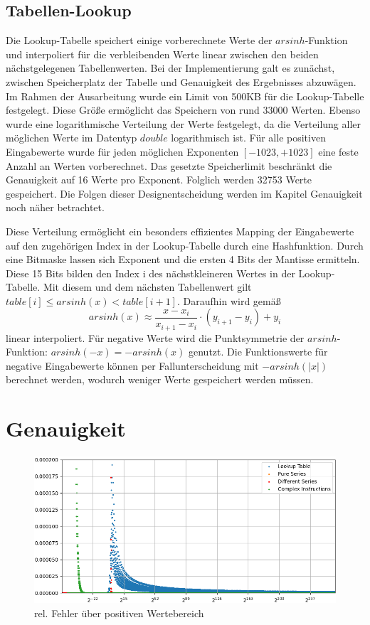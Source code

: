 \documentclass[course=erap] {aspdoc}
\begin{document}
    

    \subsection{Tabellen-Lookup}
    Die Lookup-Tabelle speichert einige vorberechnete Werte der $arsinh$-Funktion und interpoliert für die verbleibenden Werte linear zwischen den beiden nächstgelegenen Tabellenwerten.
    Bei der Implementierung galt es zunächst, zwischen Speicherplatz der Tabelle und Genauigkeit des Ergebnisses abzuwägen.
    Im Rahmen der Ausarbeitung wurde ein Limit von 500KB für die Lookup-Tabelle festgelegt.
    Diese Größe ermöglicht das Speichern von rund 33000 Werten.
    Ebenso wurde eine logarithmische Verteilung der Werte festgelegt, da die Verteilung aller möglichen Werte im Datentyp $double$ logarithmisch ist.
    Für alle positiven Eingabewerte wurde für jeden möglichen Exponenten $[-1023, +1023]$ eine feste Anzahl an Werten vorberechnet.
    Das gesetzte Speicherlimit beschränkt die Genauigkeit auf 16 Werte pro Exponent.
    Folglich werden 32753 Werte gespeichert.
    Die Folgen dieser Designentscheidung werden im Kapitel Genauigkeit noch näher betrachtet.

    Diese Verteilung ermöglicht ein besonders effizientes Mapping der Eingabewerte auf den zugehörigen Index in der Lookup-Tabelle durch eine Hashfunktion.
    Durch eine Bitmaske lassen sich Exponent und die ersten 4 Bits der Mantisse ermitteln.
    Diese 15 Bits bilden den Index i des nächstkleineren Wertes in der Lookup-Tabelle.
    Mit diesem und dem nächsten Tabellenwert gilt $table[i] \leq arsinh(x) < table[i+1]$.
    Daraufhin wird gemäß
    \[
        arsinh(x) \approx \frac{x-x_i}{x_{i+1} - x_i}\cdot (y_{i+1}-y_i) + y_i
    \]
    linear interpoliert.
    Für negative Werte wird die Punktsymmetrie der $arsinh$-Funktion: $arsinh(-x) = -arsinh(x)$ genutzt.
    Die Funktionswerte für negative Eingabewerte können per Fallunterscheidung mit $-arsinh(|x|)$ berechnet werden, wodurch weniger Werte gespeichert werden müssen.

    \section{Genauigkeit}\label{sec:genauigkeit}

    \begin{figure}[h]
        \centering
        \includegraphics[width=12cm,height=5.5cm]{images/Figure3}
        \caption{rel. Fehler über positiven Wertebereich}
        \label{fig:abb2}
    \end{figure}
\end{document}
